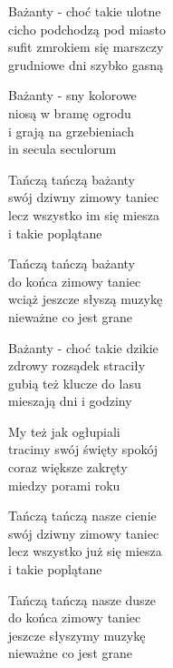 \begin{text}
    Bażanty - choć takie ulotne\\
    cicho podchodzą pod miasto\\
    sufit zmrokiem się marszczy\\
    grudniowe dni szybko gasną

    Bażanty - sny kolorowe\\
    niosą w bramę ogrodu\\
    i grają na grzebieniach\\
    in secula seculorum

    \vin Tańczą tańczą bażanty\\
    \vin swój dziwny zimowy taniec\\
    \vin lecz wszystko im się miesza\\
    \vin i takie poplątane

    \vin Tańczą tańczą bażanty\\
    \vin do końca zimowy taniec\\
    \vin wciąż jeszcze słyszą muzykę\\
    \vin nieważne co jest grane

    Bażanty - choć takie dzikie\\
    zdrowy rozsądek straciły\\
    gubią też klucze do lasu\\
    mieszają dni i godziny

    My też jak ogłupiali\\
    tracimy swój święty spokój\\
    coraz większe zakręty\\
    miedzy porami roku

    \vin Tańczą tańczą nasze cienie\\
    \vin swój dziwny zimowy taniec\\
    \vin lecz wszystko już się miesza\\
    \vin i takie poplątane

    \vin Tańczą tańczą nasze dusze\\
    \vin do końca zimowy taniec\\
    \vin jeszcze słyszymy muzykę\\
    \vin nieważne co jest grane
\end{text}
